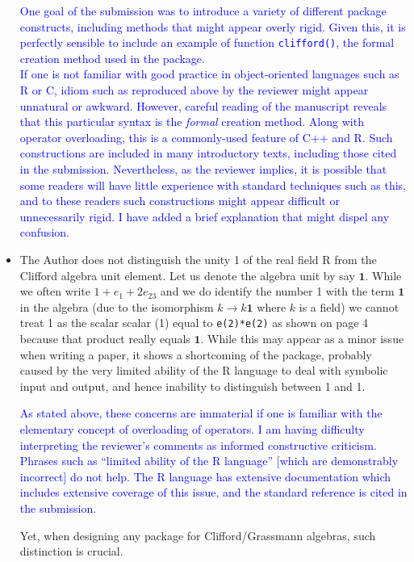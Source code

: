 \documentclass{article}
\begin{document}
\begin{itemize}
\textcolor{blue}{One goal of the submission was to introduce a variety
  of different package constructs, including methods that might appear
  overly rigid.  Given this, it is perfectly sensible to include an
  example of function {\tt clifford()}, the formal creation method
  used in the package.\\[10pt] If one is not familiar with good
  practice in object-oriented languages such as R or C, idiom such as
  reproduced above by the reviewer might appear unnatural or awkward.
  However, careful reading of the manuscript reveals that this
  particular syntax is the {\em formal} creation method.  Along with
  operator overloading, this is a commonly-used feature of C++ and R.
  Such constructions are included in many introductory texts,
  including those cited in the submission.  Nevertheless, as the
  reviewer implies, it is possible that some readers will have little
  experience with standard techniques such as this, and to these
  readers such constructions might appear difficult or unnecessarily
  rigid.  I have added a brief explanation that might dispel any
  confusion.}

\item The Author does not distinguish the unity 1 of the real field R
  from the Clifford algebra unit element. Let us denote the algebra
  unit by say $\mathbf{1}$. While we often write $1 + e_1 + 2e_{23}$
  and we do identify the number 1 with the term $\mathbf{1}$ in the
  algebra (due to the isomorphism $k\longrightarrow k\mathbf{1}$ where
  $k$ is a field) we cannot treat 1 as the scalar scalar (1) equal to
  \verb+e(2)*e(2)+ as shown on page 4 because that product really
  equals $\mathbf{1}$.  While this may appear as a minor issue when
  writing a paper, it shows a shortcoming of the package, probably
  caused by the very limited ability of the R language to deal with
  symbolic input and output, and hence inability to distinguish
  between 1 and 1.

  \textcolor{blue}{As stated above, these concerns are immaterial if
    one is familiar with the elementary concept of overloading of
    operators.  I am having difficulty interpreting the reviewer's
    comments as informed constructive criticism.  Phrases such as
    ``limited ability of the R language'' [which are demonstrably
      incorrect] do not help.  The R language has extensive
    documentation which includes extensive coverage of this issue, and
    the standard reference is cited in the submission.}

  Yet, when designing any package for Clifford/Grassmann algebras,
  such distinction is crucial.


\end{itemize}
\end{document}
